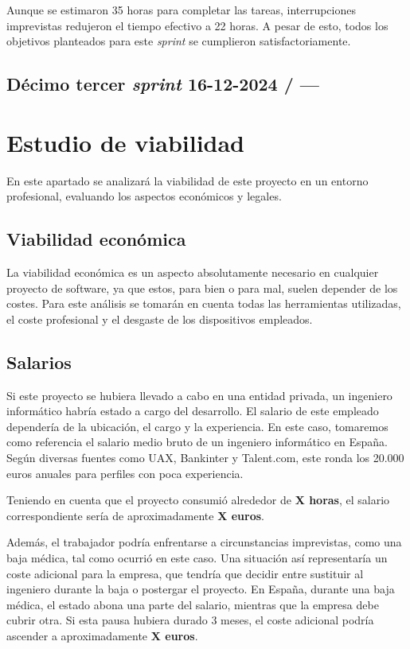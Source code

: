 Aunque se estimaron 35 horas para completar las tareas, interrupciones imprevistas redujeron el tiempo efectivo a 22 horas. A pesar de esto, todos los objetivos planteados para este \textit{sprint} se cumplieron satisfactoriamente.

\subsection{Décimo tercer \textit{sprint} 16-12-2024 / ---}



\section{Estudio de viabilidad}

En este apartado se analizará la viabilidad de este proyecto en un entorno profesional, evaluando los aspectos económicos y legales.

\subsection{Viabilidad económica}

La viabilidad económica es un aspecto absolutamente necesario en cualquier proyecto de software, ya que estos, para bien o para mal, suelen depender de los costes. Para este análisis se tomarán en cuenta todas las herramientas utilizadas, el coste profesional y el desgaste de los dispositivos empleados.

\subsection{Salarios}

Si este proyecto se hubiera llevado a cabo en una entidad privada, un ingeniero informático habría estado a cargo del desarrollo. El salario de este empleado dependería de la ubicación, el cargo y la experiencia. En este caso, tomaremos como referencia el salario medio bruto de un ingeniero informático en España. Según diversas fuentes como UAX, Bankinter y Talent.com, este ronda los 20.000 euros anuales para perfiles con poca experiencia.

Teniendo en cuenta que el proyecto consumió alrededor de \textbf{X horas}, el salario correspondiente sería de aproximadamente \textbf{X euros}. 

Además, el trabajador podría enfrentarse a circunstancias imprevistas, como una baja médica, tal como ocurrió en este caso. Una situación así representaría un coste adicional para la empresa, que tendría que decidir entre sustituir al ingeniero durante la baja o postergar el proyecto. En España, durante una baja médica, el estado abona una parte del salario, mientras que la empresa debe cubrir otra. Si esta pausa hubiera durado 3 meses, el coste adicional podría ascender a aproximadamente \textbf{X euros}.

